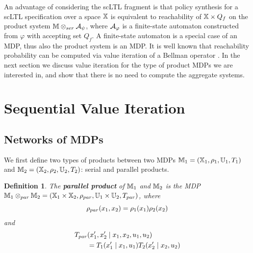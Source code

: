 \documentclass[conference]{IEEEtran}
\newtheorem{definition}{Definition}
\begin{document}
An advantage of considering the scLTL fragment is that policy synthesis for a scLTL specification over a space $\mathbb{X}$ is equivalent to reachability of $\mathbb{X}\times Q_f$ on the product system $\mathbb{M} \otimes_{ser} \mathcal{A}_\psi$, where $\mathcal{A}_\varphi$ is a finite-state automaton constructed from $\varphi$ \cite{Belta2017} with accepting set $Q_f$. A finite-state automaton is a special case of an MDP, thus also the product system is an MDP. It is well known that reachability probability can be computed via value iteration of a Bellman operator \cite{Baier2008}. In the next section we discuss value iteration for the type of product MDPs we are interested in, and show that there is no need to compute the aggregate systems.


\section{Sequential Value Iteration}
\label{sec:sequential_val_iter}


\subsection{Networks of MDPs}

We first define two types of products between two MDPs $\mathbb{M}_1 = (\mathbb{X}_1, \rho_1, \mathbb{U}_1, T_1)$ and $\mathbb{M}_2 = (\mathbb{X}_2, \rho_2, \mathbb{U}_2, T_2)$: serial and parallel products.
\begin{definition}
  The \textbf{parallel product} of $\mathbb{M}_1$ and $\mathbb{M}_2$ is the MDP $\mathbb{M}_1 \otimes_{par} \mathbb{M}_2 = (\mathbb{X}_1 \times \mathbb{X}_2, \rho_{par}, \mathbb{U}_1 \times \mathbb{U}_2, T_{par})$, where
  \begin{equation}
    \rho_{par}(x_1, x_2) = \rho_1(x_1) \rho_2(x_2)
  \end{equation}
  and
  \begin{equation}
  \begin{aligned}
      T_{par}&(x_1', x_2' \mid x_1, x_2, u_1, u_2) \\
      & = T_1 (x_1' \mid x_1, u_1) T_2 (x_2' \mid x_2, u_2)
  \end{aligned}
  \end{equation}
\end{definition}
\end{document}
